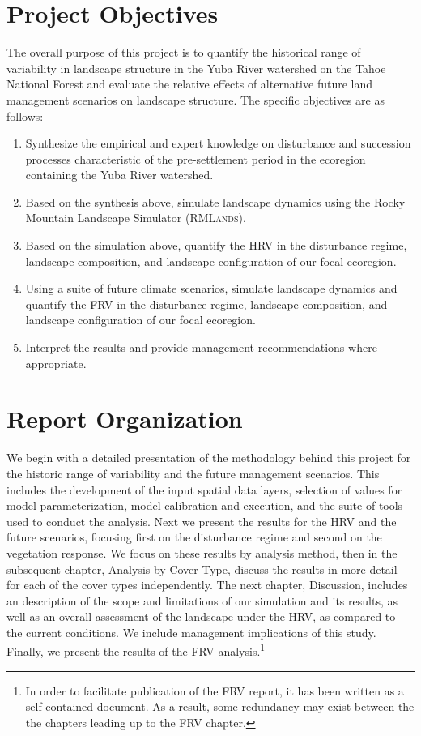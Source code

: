 \section{Project Objectives}
The overall purpose of this project is to quantify the historical range of variability in landscape structure in the Yuba River watershed on the Tahoe National Forest and evaluate the relative effects of  alternative future land management scenarios on landscape structure. The specific objectives are as follows:
\begin{enumerate}
	\item Synthesize the empirical and expert knowledge on disturbance and succession processes characteristic of the pre-settlement period in the ecoregion containing the Yuba River watershed.
	\item Based on the synthesis above, simulate landscape dynamics using the Rocky Mountain Landscape Simulator (\textsc{RMLands}).
	\item Based on the simulation above, quantify the HRV in the disturbance regime, landscape composition, and landscape configuration of our focal ecoregion.
	\item Using a suite of future climate scenarios, simulate landscape dynamics and quantify the FRV in the disturbance regime, landscape composition, and landscape configuration of our focal ecoregion.
	\item Interpret the results and provide management recommendations where appropriate.
\end{enumerate}


\section{Report Organization}

We begin with a detailed presentation of the methodology behind this project for the historic range of variability and the future management scenarios. This includes the development of the input spatial data layers, selection of values for model parameterization, model calibration and execution, and the suite of tools used to conduct the analysis. Next we present the results for the HRV and the future scenarios, focusing first on the disturbance regime and second on the vegetation response. We focus on these results by analysis method, then in the subsequent chapter, Analysis by Cover Type, discuss the results in more detail for each of the cover types independently. The next chapter, Discussion, includes an description of the scope and limitations of our simulation and its results, as well as an overall assessment of the landscape under the HRV, as compared to the current conditions. We include management implications of this study. Finally, we present the results of the FRV analysis.\footnote{In order to facilitate publication of the FRV report, it has been written as a self-contained document. As a result, some redundancy may exist between the the chapters leading up to the FRV chapter.}
